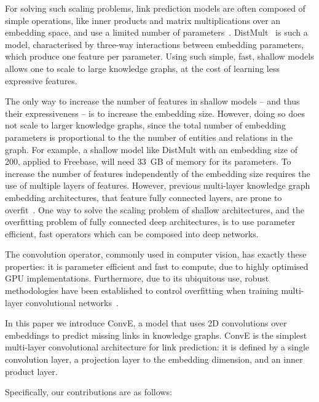 \documentclass[letterpaper]{article}
\newcommand{\citep}{\cite}
\begin{document}
For solving such scaling problems, link prediction models are often composed of simple operations, like inner products and matrix multiplications over an embedding space, and use a limited number of parameters~\citep{nickel2016review}.
DistMult~\citep{yang15:embedding} is such a model, characterised by three-way interactions between embedding parameters, which produce one feature per parameter.
Using such simple, fast, shallow models allows one to scale to large knowledge graphs, at the cost of learning less expressive features.


The only way to increase the number of features in shallow models -- and thus their expressiveness -- is to increase the embedding size.
However, doing so does not scale to larger knowledge graphs, since the total number of embedding parameters is proportional to the the number of entities and relations in the graph.
For example, a shallow model like DistMult with an embedding size of 200, applied to Freebase, will need 33~GB of memory for its parameters.
To increase the number of features independently of the embedding size requires the use of multiple layers of features.
However, previous multi-layer knowledge graph embedding architectures, that feature fully connected layers, are prone to overfit~\citep{nickel2016review}.
One way to solve the scaling problem of shallow architectures, and the overfitting problem of fully connected deep architectures, is to use parameter efficient, fast operators which can be composed into deep networks.


The convolution operator, commonly used in computer vision, has exactly these properties: it is parameter efficient and fast to compute, due to highly optimised GPU implementations.
Furthermore, due to its ubiquitous use, robust methodologies have been established to control overfitting when training multi-layer convolutional networks~\citep{szegedy2015going,ioffe2015batch,srivastava2014dropout,szegedy2016rethinking}.


In this paper we introduce ConvE, a model that uses 2D convolutions over embeddings to predict missing links in knowledge graphs.
ConvE is the simplest multi-layer convolutional architecture for link prediction: it is defined by a single convolution layer, a projection layer to the embedding dimension, and an inner product layer.


Specifically, our contributions are as follows:
\end{document}
